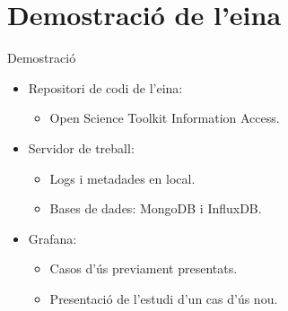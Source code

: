\section{Demostració de l'eina}\label{sec:demo}

\begin{frame}{Demostració}

\begin{itemize}
    \item Repositori de codi de l'eina:
    \begin{itemize}
        \item Open Science Toolkit Information Access.
    \end{itemize}
    \item Servidor de treball:
    \begin{itemize}
        \item Logs i metadades en local.
        \item Bases de dades: MongoDB i InfluxDB.
    \end{itemize}
    \item Grafana:
    \begin{itemize}
        \item Casos d'ús previament presentats.
        \item Presentació de l'estudi d'un cas d'ús nou.
    \end{itemize}
\end{itemize}

\end{frame}
